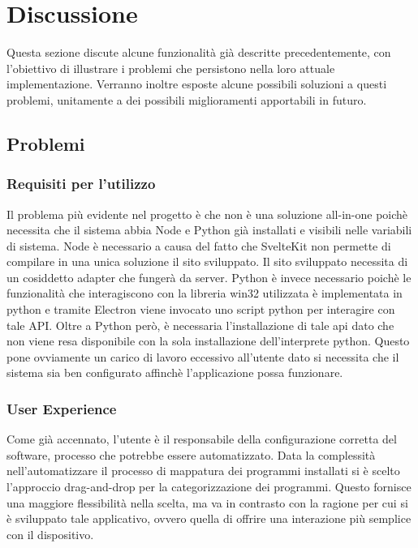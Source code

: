 \chapter{Discussione}

Questa sezione discute alcune funzionalità già descritte precedentemente, con l’obiettivo di illustrare i problemi che persistono nella loro attuale implementazione.
Verranno inoltre esposte alcune possibili soluzioni a questi problemi, unitamente a dei possibili miglioramenti apportabili in futuro.

\section{Problemi}
\subsection{Requisiti per l'utilizzo}
Il problema più evidente nel progetto è che non è una soluzione all-in-one poichè necessita che il sistema abbia Node e Python già installati e visibili nelle variabili di sistema.
Node è necessario a causa del fatto che SvelteKit non permette di compilare in una unica soluzione il sito sviluppato. Il sito sviluppato necessita di un cosiddetto adapter che fungerà da server. 
Python è invece necessario poichè le funzionalità che interagiscono con la libreria win32 utilizzata è implementata in python e tramite Electron viene invocato uno script python per interagire con tale API. 
Oltre a Python però, è necessaria l'installazione di tale api dato che non viene resa disponibile con la sola installazione dell'interprete python. 
Questo pone ovviamente un carico di lavoro eccessivo all'utente dato si necessita che il sistema sia ben configurato affinchè l'applicazione possa funzionare.

\subsection{User Experience}
Come già accennato, l'utente è il responsabile della configurazione corretta del software, processo che potrebbe essere automatizzato. 
Data la complessità nell'automatizzare il processo di mappatura dei programmi installati si è scelto l'approccio drag-and-drop per la categorizzazione dei programmi. 
Questo fornisce una maggiore flessibilità nella scelta, ma va in contrasto con la ragione per cui si è sviluppato tale applicativo, ovvero quella di offrire una interazione più semplice con il dispositivo. 

